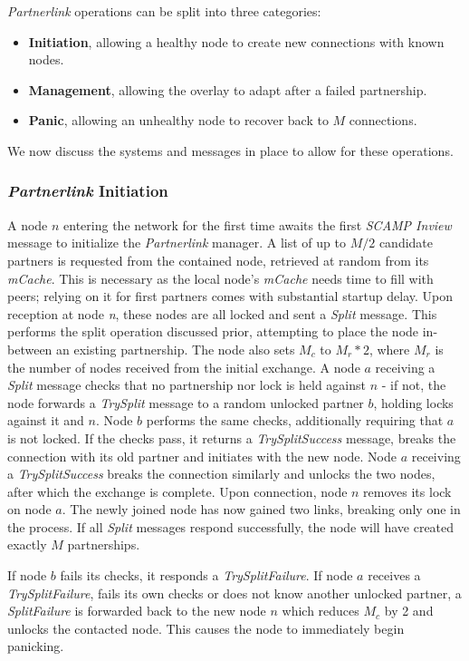 \documentclass[12pt,a4paper]{article}
\begin{document}
\textit{Partnerlink} operations can be split into three categories:
\begin{itemize}
	\item \textbf{Initiation}, allowing a healthy node to create new connections with known nodes.
	\item \textbf{Management}, allowing the overlay to adapt after a failed partnership.
	\item \textbf{Panic}, allowing an unhealthy node to recover back to \(M\) connections.
\end{itemize}
We now discuss the systems and messages in place to allow for these operations.

\subsubsection{\textit{Partnerlink} Initiation} \label{css:partnerlink:initiation}
A node \(n\) entering the network for the first time awaits the first \textit{SCAMP Inview} message to initialize the \textit{Partnerlink} manager. A list of up to \(M / 2\) candidate partners is requested from the contained node, retrieved at random from its \textit{mCache}. This is necessary as the local node's \textit{mCache} needs time to fill with peers; relying on it for first partners comes with substantial startup delay.
Upon reception at node \textit{n}, these nodes are all locked and sent a \textit{Split} message. This performs the split operation discussed prior, attempting to place the node in-between an existing partnership. The node also sets \(M_c\) to \(M_r * 2\), where \(M_r\) is the number of nodes received from the initial exchange. A node \(a\) receiving a \textit{Split} message checks that no partnership nor lock is held against \(n\) - if not, the node forwards a \textit{TrySplit} message to a random unlocked partner \(b\), holding locks against it and \(n\). Node \(b\) performs the same checks, additionally requiring that \(a\) is not locked. If the checks pass, it returns a \textit{TrySplitSuccess} message, breaks the connection with its old partner and initiates with the new node. Node \(a\) receiving a \textit{TrySplitSuccess} breaks the connection similarly and unlocks the two nodes, after which the exchange is complete. Upon connection, node \(n\) removes its lock on node \(a\). The newly joined node has now gained two links, breaking only one in the process. If all \textit{Split} messages respond successfully, the node will have created exactly \(M\) partnerships.

If node \(b\) fails its checks, it responds a \textit{TrySplitFailure}. If node \(a\) receives a \textit{TrySplitFailure}, fails its own checks or does not know another unlocked partner, a \textit{SplitFailure} is forwarded back to the new node \(n\) which reduces \(M_c\) by 2 and unlocks the contacted node. This causes the node to immediately begin panicking.
\end{document}
